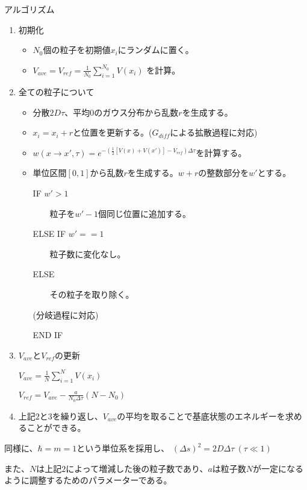 \documentclass[dvipdfmx]{beamer}
\begin{document}
    \begin{frame}{アルゴリズム}
        \begin{enumerate}
            \item 初期化
            \begin{itemize}
                \item $N_0$個の粒子を初期値$x_i$にランダムに置く。
                \item $V_{ave} = V_{ref} = \frac{1}{N_0} \sum_{i=1}^{N_0}V(x_i)$ を計算。
            \end{itemize}

            \item 全ての粒子について
            \begin{itemize}
                \item 分散$2D\tau$、平均$0$のガウス分布から乱数$r$を生成する。
                \item $x_i = x_i + r$と位置を更新する。($G_{diff}$による拡散過程に対応)
                \item $w(x\to x',\tau) = e^{-(\frac{1}{2}[V(x)+V(x')]-V_{ref})\Delta\tau}$を計算する。
                \item 単位区間$[0,1]$から乱数$r$を生成する。$w+r$の整数部分を$w'$とする。

                IF $w' > 1$

                ~~~~粒子を$w'-1$個同じ位置に追加する。

                ELSE IF $w' == 1$

                ~~~~粒子数に変化なし。

                ELSE

                ~~~~その粒子を取り除く。

                (分岐過程に対応)

                END IF
            \end{itemize}

        \end{enumerate}

    \end{frame}

    \begin{frame}
        \begin{enumerate}
            \setcounter{enumi}{2}
            \item $V_{ave}$と$V_{ref}$の更新

            $V_{ave} = \frac{1}{N}\sum_{i=1}^{N}V(x_i)$

            $V_{ref} = V_{ave} - \frac{a}{N_0\Delta\tau}(N-N_0)$

            \item 上記$2$と$3$を繰り返し、$V_{ave}$の平均を取ることで基底状態のエネルギーを求めることができる。
        \end{enumerate}
        同様に、$\hbar = m = 1$という単位系を採用し、
        $(\Delta s)^2 = 2D\Delta \tau~(\tau \ll 1)$

        また、$N$は上記$2$によって増減した後の粒子数であり、$a$は粒子数$N$が一定になるように調整するためのパラメーターである。
    \end{frame}
\end{document}
